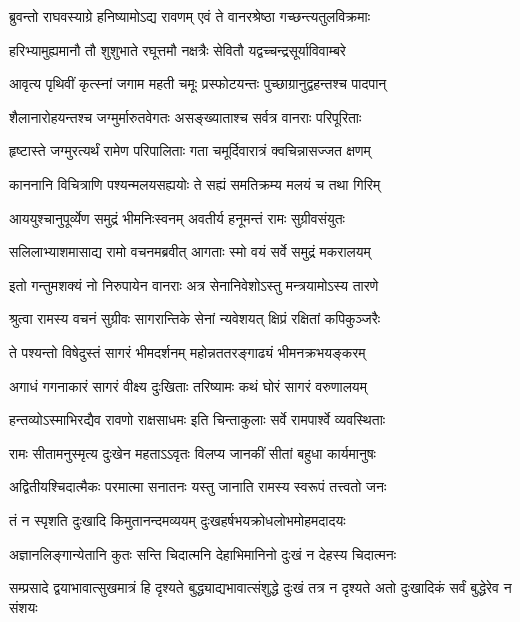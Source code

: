 \twolineshloka
{ब्रुवन्तो राघवस्याग्रे हनिष्यामोऽद्य रावणम्}
{एवं ते वानरश्रेष्ठा गच्छन्त्यतुलविक्रमाः} %

\twolineshloka
{हरिभ्यामुह्यमानौ तौ शुशुभाते रघूत्तमौ}
{नक्षत्रैः सेवितौ यद्वच्चन्द्रसूर्याविवाम्बरे} %

\twolineshloka
{आवृत्य पृथिवीं कृत्स्नां जगाम महती चमूः}
{प्रस्फोटयन्तः पुच्छाग्रानुद्वहन्तश्च पादपान्} %

\twolineshloka
{शैलानारोहयन्तश्च जग्मुर्मारुतवेगतः}
{असङ्ख्याताश्च सर्वत्र वानराः परिपूरिताः} %

\twolineshloka
{हृष्टास्ते जग्मुरत्यर्थं रामेण परिपालिताः}
{गता चमूर्दिवारात्रं क्वचिन्नासज्जत क्षणम्} %

\twolineshloka
{काननानि विचित्राणि पश्यन्मलयसह्ययोः}
{ते सह्यं समतिक्रम्य मलयं च तथा गिरिम्} %

\twolineshloka
{आययुश्चानुपूर्व्येण समुद्रं भीमनिःस्वनम्}
{अवतीर्य हनूमन्तं रामः सुग्रीवसंयुतः} %

\twolineshloka
{सलिलाभ्याशमासाद्य रामो वचनमब्रवीत्}
{आगताः स्मो वयं सर्वे समुद्रं मकरालयम्} %

\twolineshloka
{इतो गन्तुमशक्यं नो निरुपायेन वानराः}
{अत्र सेनानिवेशोऽस्तु मन्त्रयामोऽस्य तारणे} %

\twolineshloka
{श्रुत्वा रामस्य वचनं सुग्रीवः सागरान्तिके}
{सेनां न्यवेशयत् क्षिप्रं रक्षितां कपिकुञ्जरैः} %

\twolineshloka
{ते पश्यन्तो विषेदुस्तं सागरं भीमदर्शनम्}
{महोन्नततरङ्गाढ्यं भीमनक्रभयङ्करम्} %

\twolineshloka
{अगाधं गगनाकारं सागरं वीक्ष्य दुःखिताः}
{तरिष्यामः कथं घोरं सागरं वरुणालयम्} %

\twolineshloka
{हन्तव्योऽस्माभिरद्यैव रावणो राक्षसाधमः}
{इति चिन्ताकुलाः सर्वे रामपार्श्वे व्यवस्थिताः} %

\twolineshloka
{रामः सीतामनुस्मृत्य दुःखेन महताऽऽवृतः}
{विलप्य जानकीं सीतां बहुधा कार्यमानुषः} %

\twolineshloka
{अद्वितीयश्चिदात्मैकः परमात्मा सनातनः}
{यस्तु जानाति रामस्य स्वरूपं तत्त्वतो जनः} %

\twolineshloka
{तं न स्पृशति दुःखादि किमुतानन्दमव्ययम्}
{दुःखहर्षभयक्रोधलोभमोहमदादयः} %

\twolineshloka
{अज्ञानलिङ्गान्येतानि कुतः सन्ति चिदात्मनि}
{देहाभिमानिनो दुःखं न देहस्य चिदात्मनः} %

\threelineshloka
{सम्प्रसादे द्वयाभावात्सुखमात्रं हि दृश्यते}
{बुद्ध्याद्यभावात्संशुद्धे दुःखं तत्र न दृश्यते}
{अतो दुःखादिकं सर्वं बुद्धेरेव न संशयः} %

